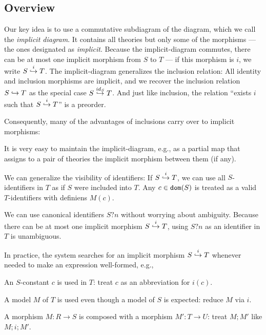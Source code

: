 \subsection{Overview}

Our key idea is to use a commutative subdiagram of the \mmt diagram, which we call the \emph{implicit diagram}.
It contains all theories but only some of the morphisms --- the ones designated as \emph{implicit}.
Because the implicit-diagram commutes, there can be at most one implicit morphism from $S$ to $T$ --- if this morphism is $i$, we write $\ipc{i}{S}{T}$.
The implicit-diagram generalizes the inclusion relation:
All identity and inclusion morphisms are implicit, and we recover the inclusion relation $S\harr T$ as the special case $\ipc{\id{S}}{S}{T}$.
And just like inclusion, the relation ``exists $i$ such that $\ipc{i}{S}{T}$'' is a preorder.

Consequently, many of the advantages of inclusions carry over to implicit morphisms:
\begin{compactitem}
\item It is very easy to maintain the implicit-diagram, e.g., as a partial map that assigns to a pair of theories the implicit morphism between them (if any).
\item We can generalize the visibility of identifiers: If $\ipc{i}{S}{T}$, we can use all $S$-identifiers in $T$ as if $S$ were included into $T$.
Any $c\in\dom{S}$ is treated as a valid $T$-identifiers with definiens $M(c)$.
\item We can use canonical identifiers $S?n$ without worrying about ambiguity.
Because there can be at most one implicit morphism $\ipc{i}{S}{T}$, using $S?n$ as an identifier in $T$ is unambiguous.
\end{compactitem}

In practice, the \mmt system searches for an implicit morphism $\ipc{i}{S}{T}$ whenever needed to make an expression well-formed, e.g.,
\begin{compactitem}
 \item An $S$-constant $c$ is used in $T$: treat $c$ as an abbreviation for $i(c)$.
 \item A model $M$ of $T$ is used even though a model of $S$ is expected: reduce $M$ via $i$.
 \item A morphism $M:R\to S$ is composed with a morphism $M':T\to U$: treat $M;M'$ like $M;i;M'$.
\end{compactitem}

